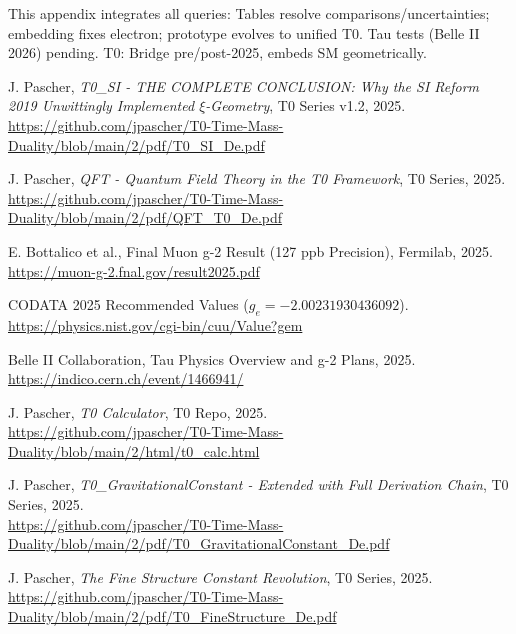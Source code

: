 \documentclass[12pt,a4paper]{article}
\begin{document}
	This appendix integrates all queries: Tables resolve comparisons/uncertainties; embedding fixes electron; prototype evolves to unified T0. Tau tests (Belle II 2026) pending. T0: Bridge pre/post-2025, embeds SM geometrically.
	
	
	\begin{thebibliography}{99}
		 J. Pascher, \textit{T0\_SI - THE COMPLETE CONCLUSION: Why the SI Reform 2019 Unwittingly Implemented $\xi$-Geometry}, T0 Series v1.2, 2025. \\
		\url{https://github.com/jpascher/T0-Time-Mass-Duality/blob/main/2/pdf/T0_SI_De.pdf}
		
		 J. Pascher, \textit{QFT - Quantum Field Theory in the T0 Framework}, T0 Series, 2025. \\
		\url{https://github.com/jpascher/T0-Time-Mass-Duality/blob/main/2/pdf/QFT_T0_De.pdf}
		
		 E. Bottalico et al., Final Muon g-2 Result (127 ppb Precision), Fermilab, 2025. \\
		\url{https://muon-g-2.fnal.gov/result2025.pdf}
		
		 CODATA 2025 Recommended Values ($g_e = -2.00231930436092$). \\
		\url{https://physics.nist.gov/cgi-bin/cuu/Value?gem}
		
		 Belle II Collaboration, Tau Physics Overview and g-2 Plans, 2025. \\
		\url{https://indico.cern.ch/event/1466941/}
		
		 J. Pascher, \textit{T0 Calculator}, T0 Repo, 2025. \\
		\url{https://github.com/jpascher/T0-Time-Mass-Duality/blob/main/2/html/t0_calc.html}
		
		 J. Pascher, \textit{T0\_GravitationalConstant - Extended with Full Derivation Chain}, T0 Series, 2025. \\
		\url{https://github.com/jpascher/T0-Time-Mass-Duality/blob/main/2/pdf/T0_GravitationalConstant_De.pdf}
		
		 J. Pascher, \textit{The Fine Structure Constant Revolution}, T0 Series, 2025. \\
		\url{https://github.com/jpascher/T0-Time-Mass-Duality/blob/main/2/pdf/T0_FineStructure_De.pdf}
		

\end{thebibliography}
\end{document}
